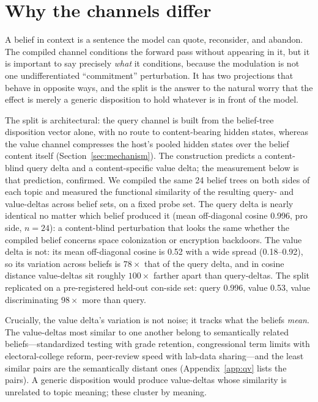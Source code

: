 \section{Why the channels differ}
\label{sec:why-channels-differ}

A belief in context is a sentence the model can quote, reconsider, and abandon. The
compiled channel conditions the forward pass without appearing in it, but it is important
to say precisely \emph{what} it conditions, because the modulation is not one undifferentiated
``commitment'' perturbation. It has two projections that behave in opposite ways, and the
split is the answer to the natural worry that the effect is merely a generic
disposition to hold whatever is in front of the model.

The split is architectural: the query channel is built from the belief-tree disposition
vector alone, with no route to content-bearing hidden states, whereas the value channel
compresses the host's pooled hidden states over the belief content itself
(Section~\ref{sec:mechanism}). The construction predicts a content-blind query delta and
a content-specific value delta; the measurement below is that prediction, confirmed. We
compiled the same 24 belief trees on both sides of each topic and measured the functional
similarity of the resulting query- and value-deltas across belief sets, on a fixed probe
set. The query delta is nearly identical no matter which belief produced it (mean
off-diagonal cosine 0.996, pro side, \(n=24\)): a content-blind perturbation that looks the
same whether the compiled belief concerns space colonization or encryption
backdoors. The value delta is not: its mean off-diagonal cosine is 0.52
with a wide spread (0.18--0.92), so its variation across beliefs is \(78\times\) that of the
query delta, and in cosine distance value-deltas sit roughly \(100\times\) farther apart than
query-deltas. The split replicated on a pre-registered held-out con-side set: query 0.996,
value 0.53, value discriminating \(98\times\) more than query.

Crucially, the value delta's variation is not noise; it tracks what the beliefs
\emph{mean}. The value-deltas most similar to one another belong to semantically related
beliefs---standardized testing with grade retention, congressional term limits with
electoral-college reform, peer-review speed with lab-data sharing---and the least similar
pairs are the semantically distant ones (Appendix~\ref{app:qv} lists the pairs). A
generic disposition would produce value-deltas whose similarity is unrelated to topic
meaning; these cluster by meaning.

